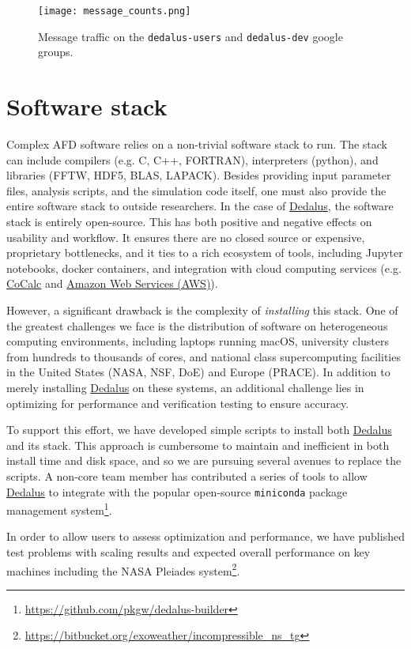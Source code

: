 \documentclass[12pt, titlepage]{aastex62}
\newcommand{\dedalus}{\href{http://dedalus-project.org}{Dedalus}}
\begin{document}
\begin{figure}
  \centering
  \texttt{[image: message\_counts.png]}
  \caption{Message traffic on the \texttt{dedalus-users} and \texttt{dedalus-dev} google groups.}
  \label{fig:messages}
\end{figure}

\section{Software stack}
\label{sec:stack}

Complex AFD software relies on a non-trivial software stack to run. The stack can include compilers (e.g. C, C++, FORTRAN), interpreters (python), and libraries (FFTW, HDF5, BLAS, LAPACK). Besides providing input parameter files, analysis scripts, and the simulation code itself, one must also provide the entire software stack to outside researchers. In the case of \dedalus{}, the software stack is entirely open-source. This has both positive and negative effects on usability and workflow. It ensures there are no closed source or expensive, proprietary bottlenecks, and it ties to a rich ecosystem of tools, including Jupyter notebooks, docker containers, and integration with cloud computing services (e.g. \href{http://cocalc.com}{CoCalc} and \href{https://aws.amazon.com}{Amazon Web Services (AWS)}). 

However, a significant drawback is the complexity of \emph{installing} this stack. One of the greatest challenges we face is the distribution of software on heterogeneous computing environments, including laptops running macOS, university clusters from hundreds to thousands of cores, and national class supercomputing facilities in the United States (NASA, NSF, DoE) and Europe (PRACE). In addition to merely installing \dedalus{} on these systems, an additional challenge lies in optimizing for performance and verification testing to ensure accuracy. 

To support this effort, we have developed simple scripts to install both \dedalus{} and its stack. This approach is cumbersome to maintain and inefficient in both install time and disk space, and so we are pursuing several avenues to replace the scripts. A non-core team member has contributed a series of tools to allow \dedalus{} to integrate with the popular open-source \texttt{miniconda} package management system\footnote{\url{https://github.com/pkgw/dedalus-builder}}.

In order to allow users to assess optimization and performance, we have published test problems with scaling results and expected overall performance on key machines including the NASA Pleiades system\footnote{\url{https://bitbucket.org/exoweather/incompressible_ns_tg}}. 
\end{document}
